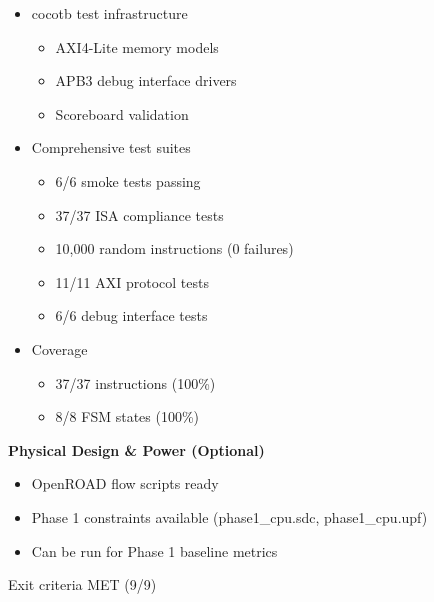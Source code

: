 \begin{record}
\begin{itemize}
\tightlist
\item
  \ok{} cocotb test infrastructure

  \begin{itemize}
  \tightlist
  \item
    \ok{} AXI4-Lite memory models
  \item
    \ok{} APB3 debug interface drivers
  \item
    \ok{} Scoreboard validation
  \end{itemize}
\item
  \ok{} Comprehensive test suites

  \begin{itemize}
  \tightlist
  \item
    \ok{} 6/6 smoke tests passing
  \item
    \ok{} 37/37 ISA compliance tests
  \item
    \ok{} 10,000 random instructions (0 failures)
  \item
    \ok{} 11/11 AXI protocol tests
  \item
    \ok{} 6/6 debug interface tests
  \end{itemize}
\item
  \ok{} Coverage

  \begin{itemize}
  \tightlist
  \item
    \ok{} 37/37 instructions (100\%)
  \item
    \ok{} 8/8 FSM states (100\%)
  \end{itemize}
\end{itemize}

\textbf{Physical Design \& Power (Optional)}

\begin{itemize}
\tightlist
\item
  OpenROAD flow scripts ready
\item
  Phase 1 constraints available (phase1\_\allowbreak{}cpu.sdc,
  phase1\_\allowbreak{}cpu.upf)
\item
  Can be run for Phase 1 baseline metrics
\end{itemize}

\ok{} Exit criteria MET (9/9)


\end{record}
